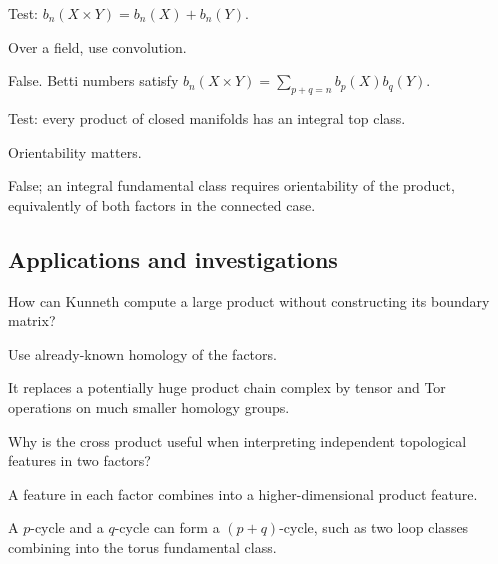 \begin{exercise}\label{exr:viii27-ped-11}
Test: $b_n(X\times Y)=b_n(X)+b_n(Y)$.
\end{exercise}
\begin{hint}
Over a field, use convolution.
\end{hint}
\begin{solution}
False. Betti numbers satisfy $b_n(X\times Y)=\sum_{p+q=n}b_p(X)b_q(Y)$.
\end{solution}

\begin{exercise}\label{exr:viii27-ped-12}
Test: every product of closed manifolds has an integral top class.
\end{exercise}
\begin{hint}
Orientability matters.
\end{hint}
\begin{solution}
False; an integral fundamental class requires orientability of the product, equivalently of both factors in the connected case.
\end{solution}

\subsection*{Applications and investigations}

\begin{exercise}\label{exr:viii27-ped-13}
How can Kunneth compute a large product without constructing its boundary matrix?
\end{exercise}
\begin{hint}
Use already-known homology of the factors.
\end{hint}
\begin{solution}
It replaces a potentially huge product chain complex by tensor and Tor operations on much smaller homology groups.
\end{solution}

\begin{exercise}\label{exr:viii27-ped-14}
Why is the cross product useful when interpreting independent topological features in two factors?
\end{exercise}
\begin{hint}
A feature in each factor combines into a higher-dimensional product feature.
\end{hint}
\begin{solution}
A $p$-cycle and a $q$-cycle can form a $(p+q)$-cycle, such as two loop classes combining into the torus fundamental class.
\end{solution}


